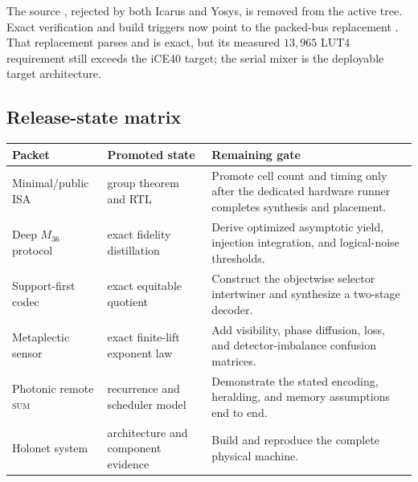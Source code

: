 The source , rejected by both Icarus and Yosys, is removed
from the active tree. Exact verification and build triggers now point to the packed-bus
replacement . That replacement parses and
is exact, but its measured $13{,}965$ LUT4 requirement still exceeds the iCE40 target; the
serial mixer is the deployable target architecture.

\subsection{Release-state matrix}
\begin{center}
\begin{tabular}{@{}p{3.6cm}p{2.8cm}p{6.6cm}@{}}
\toprule
\textbf{Packet} & \textbf{Promoted state} & \textbf{Remaining gate}\\
\midrule
Minimal/public ISA & group theorem and RTL & Promote cell count and timing only after the
dedicated hardware runner completes synthesis and placement.\\
Deep $M_{36}$ protocol & exact fidelity distillation & Derive optimized asymptotic yield,
injection integration, and logical-noise thresholds.\\
Support-first codec & exact equitable quotient & Construct the objectwise selector
intertwiner and synthesize a two-stage decoder.\\
Metaplectic sensor & exact finite-lift exponent law & Add visibility, phase diffusion,
loss, and detector-imbalance confusion matrices.\\
Photonic remote \textsc{sum} & recurrence and scheduler model & Demonstrate the stated
encoding, heralding, and memory assumptions end to end.\\
Holonet system & architecture and component evidence & Build and reproduce the complete
physical machine.\\
\bottomrule
\end{tabular}
\end{center}
